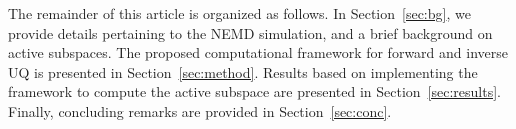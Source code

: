 The remainder of this article is organized as follows. In Section~\ref{sec:bg}, we provide details
pertaining to the NEMD simulation, and a brief background on active subspaces.
The proposed computational framework for forward and inverse UQ is presented in
Section~\ref{sec:method}. Results based on implementing the framework to
compute the active subspace
are presented in Section~\ref{sec:results}. Finally, concluding remarks are provided 
in Section~\ref{sec:conc}.
































